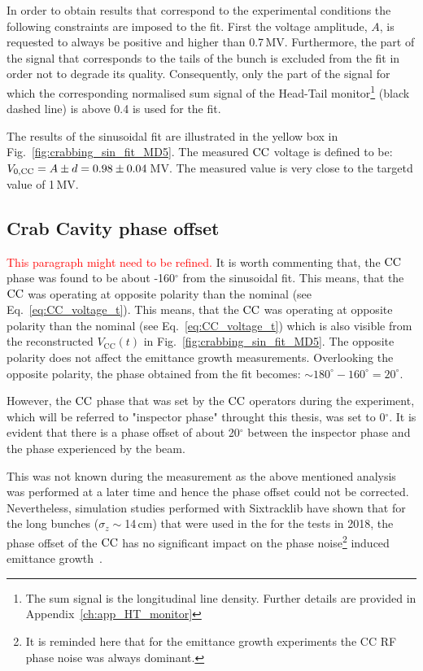 In order to obtain results that correspond to the experimental conditions the following constraints are imposed to the fit. First the voltage amplitude, $A$, is requested to always be positive and higher than 0.7\,MV. Furthermore, the part of the signal that corresponds to the tails of the bunch is excluded from the fit in order not to degrade its quality. Consequently, only the part of the signal for which the corresponding normalised sum signal of the Head-Tail monitor\footnote{The sum signal is the longitudinal line density. Further details are provided in Appendix~\ref{ch:app_HT_monitor}} (black dashed line) is above 0.4 is used for the fit. 

The results of the sinusoidal fit are illustrated in the yellow box in Fig.~\ref{fig:crabbing_sin_fit_MD5}. The measured ${\mathrm{CC}}$ voltage is defined to be: ${V_\mathrm{0, CC}}= A \pm d=0.98\pm0.04$\,MV. The measured value is very close to the targetd value of 1\,MV. 

\subsection{Crab Cavity phase offset}\label{subsec:cc_phase_offset_2018}
\textcolor{red}{This paragraph might need to be refined.}
It is worth commenting that, the ${\mathrm{CC}}$ phase was found to be about -160$^\circ$ from the sinusoidal fit. This means, that the ${\mathrm{CC}}$ was operating at opposite polarity than the nominal (see Eq.~\eqref{eq:CC_voltage_t}). This means, that the ${\mathrm{CC}}$ was operating at opposite polarity than the nominal (see Eq.~\eqref{eq:CC_voltage_t}) which is also visible from the reconstructed $V_\mathrm{CC}(t)$ in Fig.~\ref{fig:crabbing_sin_fit_MD5}. The opposite polarity does not affect the emittance growth measurements. Overlooking the opposite polarity, the phase obtained from the fit becomes: $\sim 180^\circ-160^\circ=20^\circ$. 

However, the ${\mathrm{CC}}$ phase that was set by the ${\mathrm{CC}}$ operators during the experiment, which will be referred to "inspector phase" throught this thesis, was set to 0$^\circ$. It is evident that there is a phase offset of about 20$^\circ$ between the inspector phase and the phase experienced by the beam.

This was not known during the measurement as the above mentioned analysis was performed at a later time and hence the phase offset could not be corrected. Nevertheless, simulation studies performed with Sixtracklib have shown that for the long bunches ($\sigma_z \sim$14\,cm) that were used in the for the tests in 2018, the phase offset of the ${\mathrm{CC}}$ has no significant impact on the phase noise\footnote{It is reminded here that for the emittance growth experiments the CC RF phase noise was always dominant.} induced emittance growth~\cite{wp4_triantafyllou_2020}. %

